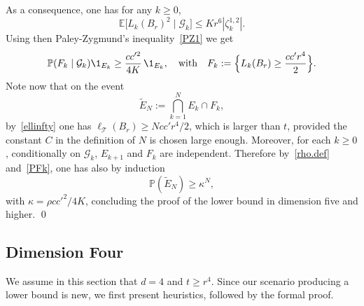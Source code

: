 As a consequence, one has for any $k\ge 0$,
\[
\mathbb E\big[L_k(B_r)^2\mid \mathcal G_k\big] \le Kr^6 |\zeta_k^{1,2}|.
\]
Using then Paley-Zygmund's inequality~\eqref{PZ1} we get
\begin{equation}\label{PFk}
\mathbb P(F_k \mid \mathcal G_k)\1_{E_k} \ge \frac{cc'^2}{4K}\,\1_{E_k}, \quad \text{with}\quad F_k:= \Big\{L_k(B_r)\ge \frac{cc'r^4}{2}\Big\}.
\end{equation}
Note now that on the event
\[
\tilde E_N := \bigcap_{k=1}^N E_k \cap F_k,
\]
by~\eqref{ellinfty} one has $\ell_{\mathcal T}(B_r) \ge N cc'r^4/2$, which is larger than $t$, provided the constant $C$ in the definition of $N$ is chosen
large enough. Moreover, for each $k\ge 0$, conditionally on $\mathcal G_k$, $E_{k+1}$ and $F_k$ are independent. Therefore by~\eqref{rho.def} and~\eqref{PFk}, one has also by induction
\[
\mathbb P(\tilde E_N) \ge \kappa^N,
\]
with $\kappa=\rho cc'^2/4K$, concluding the proof of the lower bound in dimension five and higher. \qed

\subsection{Dimension Four}
We assume in this section that $d=4$ and $t\ge r^4$.
Since our scenario producing a lower bound is new, we first present
heuristics, followed by the formal proof.

